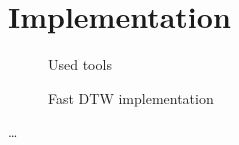 \chapter{Implementation}
\label{ch:implementation}

\begin{figure}
    \centering
    
    \caption{Used tools}
    \label{fig:tools}
\end{figure}

\begin{figure}
    \centering
    
    \caption{Fast DTW implementation}
    \label{fig:dtw_fast}
\end{figure}

\dots
